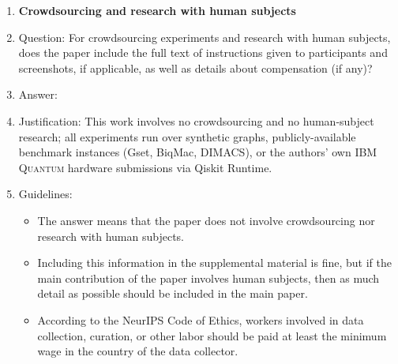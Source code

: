\begin{enumerate}
\item {\bf Crowdsourcing and research with human subjects}
    \item[] Question: For crowdsourcing experiments and research with human subjects, does the paper include the full text of instructions given to participants and screenshots, if applicable, as well as details about compensation (if any)?
    \item[] Answer: \answerNA{} %
    \item[] Justification: This work involves no crowdsourcing and no
        human-subject research; all experiments run over synthetic
        graphs, publicly-available benchmark instances (Gset, BiqMac,
        DIMACS), or the authors' own \textsc{IBM Quantum} hardware
        submissions via Qiskit Runtime.
    \item[] Guidelines:
    \begin{itemize}
        \item The answer \answerNA{} means that the paper does not involve crowdsourcing nor research with human subjects.
        \item Including this information in the supplemental material is fine, but if the main contribution of the paper involves human subjects, then as much detail as possible should be included in the main paper.
        \item According to the NeurIPS Code of Ethics, workers involved in data collection, curation, or other labor should be paid at least the minimum wage in the country of the data collector.
    \end{itemize}


\end{enumerate}
